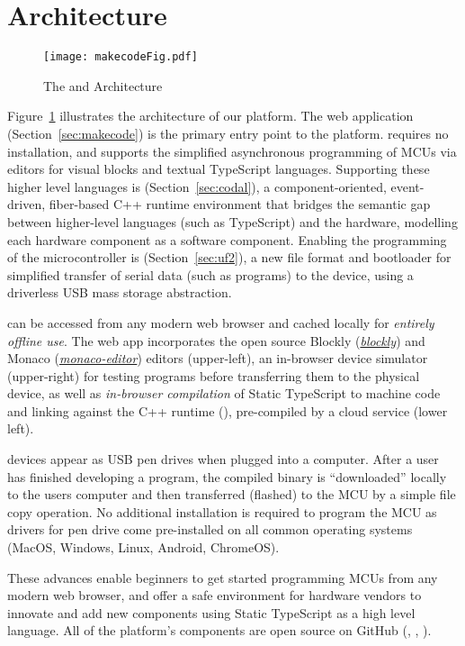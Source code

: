  \section{Architecture}

\begin{figure}[t]
    \texttt{[image: makecodeFig.pdf]}
\caption{\label{fig:makecode}The \MC and \CO Architecture}
\end{figure}

Figure~\ref{fig:makecode} illustrates the architecture of our platform. The \MC web application (Section~\ref{sec:makecode}) is the primary entry point to the platform. \MC requires no installation, and supports the simplified asynchronous programming of MCUs via editors for visual blocks and textual TypeScript languages. Supporting these higher level languages is \CO (Section~\ref{sec:codal}), a component-oriented, event-driven, fiber-based C++ runtime environment that bridges the semantic gap between higher-level languages (such as TypeScript) and the hardware, modelling each hardware component as a software component. Enabling the programming of the microcontroller is \UF (Section~\ref{sec:uf2}), a new file format and bootloader for simplified transfer of serial data (such as programs) to the device, using a driverless USB mass storage abstraction.

\MC can be accessed from any modern web browser and cached locally for \emph{entirely offline use}. The \MC web app incorporates the open source Blockly (\emph{\href{https://github.com/google/blockly}{blockly}}) and Monaco (\emph{\href{https://github.com/Microsoft/monaco-editor}{monaco-editor}}) editors (upper-left), an in-browser device simulator (upper-right) for testing programs before transferring them to the physical device, as well as \emph{in-browser compilation} of Static TypeScript to machine code and linking against the C++ runtime (\emph{\CON}), pre-compiled by a cloud service (lower left).

\MC devices appear as USB pen drives when plugged into a computer. After a user has finished developing a program, the compiled binary is ``downloaded'' locally to the users computer and then transferred (flashed) to the MCU by a simple file copy operation. No additional installation is required to program the MCU as drivers for pen drive come pre-installed on all common operating systems (MacOS, Windows, Linux, Android, ChromeOS).

These advances enable beginners to get started programming MCUs from any modern web browser, and offer a safe environment for hardware vendors to innovate and add new components using Static TypeScript as a high level language. All of the platform's components are open source on GitHub (\emph{\href{https://github.com/microsoft/pxt}{\MCN}}, \emph{\href{https://github.com/lancaster-university/codal}{\CON}}, \emph{\href{https://github.com/microsoft/UF2}{\UFN}}).